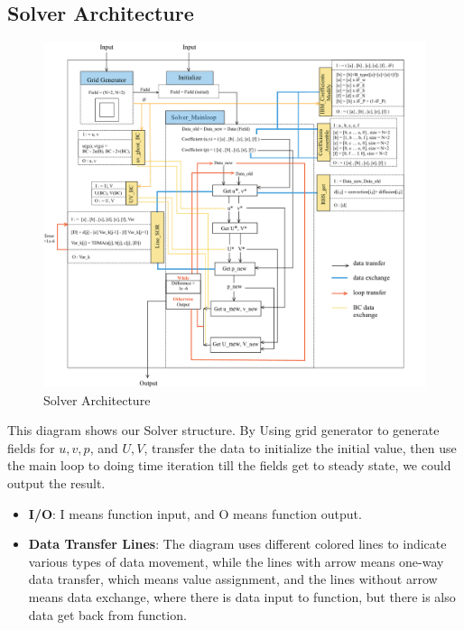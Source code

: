 \documentclass[12pt]{article}
\begin{document}
\subsection{Solver Architecture}
\begin{figure}[H]
    \centering
    \includegraphics[width=1\linewidth]{figure/Solver and Stting/Solver_Strture.jpg}
    \caption{Solver Architecture}
\end{figure}


This diagram shows our Solver structure. By Using grid generator to generate fields for $u, v, p$, and $U, V$, transfer the data to initialize the initial value, then use the main loop to doing time iteration till the fields get to steady state, we could output the result. \\

\begin{itemize}
    \item \textbf{I/O}: I means function input, and O means function output.
    \item \textbf{Data Transfer Lines}: The diagram uses different colored lines to indicate various types of data movement, while the lines with arrow means one-way data transfer, which means value assignment, and the lines without arrow means data exchange, where there is data input to function, but there is also data get back from function.
\end{itemize}
\end{document}
